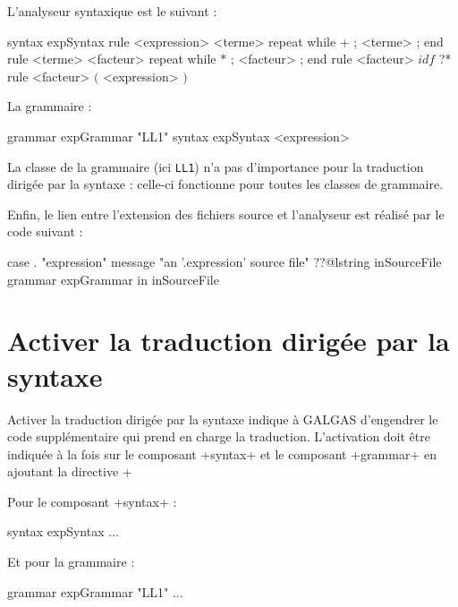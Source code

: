 L'analyseur syntaxique est le suivant :
\begin{galgascode}
syntax expSyntax {
  rule <expression> {
    <terme>
    repeat while $+$ ; <terme> ; end
  }
  rule <terme> {
    <facteur>
    repeat while $*$ ; <facteur> ; end
  }
  rule <facteur> {
    $idf$ ?*
  }
  rule <facteur> {
    $($
    <expression>
    $)$
  }
}
\end{galgascode}

La grammaire :
\begin{galgascode}
grammar expGrammar "LL1" {
  syntax expSyntax
  <expression>
}
\end{galgascode}

La classe de la grammaire (ici \texttt{LL1}) n'a pas d'importance pour la traduction dirigée par la syntaxe : celle-ci fonctionne pour toutes les classes de grammaire. 

Enfin, le lien entre l'extension des fichiers source et l'analyseur est réalisé par le code suivant :
\begin{galgascode}
case . "expression"
message "an '.expression' source file"
??@lstring inSourceFile {
  grammar expGrammar in inSourceFile
}
\end{galgascode}








\section{Activer la traduction dirigée par la syntaxe}

Activer la traduction dirigée par la syntaxe indique à GALGAS d'engendrer le code supplémentaire qui prend en charge la traduction. L'activation doit être indiquée à la fois sur le composant \ggs+syntax+ et le composant \ggs+grammar+ en ajoutant la directive \ggs+%

Pour le composant \ggs+syntax+ :
\begin{galgascode}
syntax expSyntax %
  ...
\end{galgascode}

Et pour la grammaire :
\begin{galgascode}
grammar expGrammar "LL1" %
  ...
\end{galgascode}


